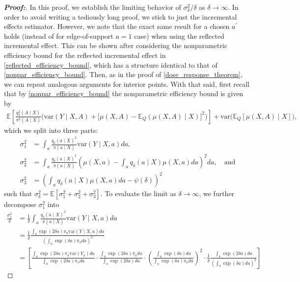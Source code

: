 \documentclass[10pt,a4paper]{amsart}
\newcommand{\var}{\text{var}}
\begin{document}
\begin{proof}[\textbf{Proof:}]
In this proof, we establish the limiting behavior of $\sigma^2_\delta / \delta$ as $\delta \to \infty$. In order to avoid writing a tediously long proof, we stick to just the incremental effects estimator. However, we note that the exact same result for a chosen $a^\prime$ holds (instead of for edge-of-support $a = 1$ case) when using the reflected incremental effect. This can be shown after considering the nonparametric efficiency bound for the reflected incremental effect in \cref{reflected_efficiency_bound}, which has a structure identical to that of \cref{nonpar_efficiency_bound}. Then, as in the proof of \cref{dose_response_theorem}, we can repeat analogous arguments for interior points. With that said, first recall that by \cref{nonpar_efficiency_bound} the nonparametric efficiency bound is given by
 \begin{align*}
     \mathbb{E}\left[\frac{q^2_\delta(A \mid X)}{\pi^2(A \mid X)} \Big( \var\left( Y \mid X, A \right) +  \big[ \mu(X, A) - \mathbb{E}_Q(\mu(X, A) \mid X) \big]^2 \Big) \right] + \var\Big( \mathbb{E}_Q\left[\mu(X, A) \mid X \right] \Big),
\end{align*}
which we split into three parts:
\begin{align*}
    \sigma_1^2 &= \int_a \frac{q_\delta(a \mid X)^2}{\pi(a \mid X)} \var\left( Y \mid X, a \right) da, \\
    \sigma_2^2 &= \int_a \frac{q_\delta(a \mid X)^2}{\pi(a \mid X)}\left( \mu(X, a) - \int_a q_\delta(a \mid X) \mu(X, a)da \right)^2 da, \quad \text{and}\\
    \sigma_3^2 &= \left(\int_a q_\delta(a \mid X) \mu(X, a)da  - \psi(\delta) \right)^2
\end{align*}
such that $\sigma^2_\delta = \mathbb{E}\left[\sigma_1^2 + \sigma_2^2 + \sigma_3^2 \right]$. To evaluate the limit as $\delta \to \infty$, we further decompose $\sigma^2_1$ into
\begin{align*}
    \frac{\sigma^2_1}{\delta} &= \frac{1}{\delta} \int_a \frac{q_\delta(a \mid X)^2}{\pi(a \mid X)} \var\left( Y \mid X, a \right) da \\
    &= \frac{1}{\delta} \frac{\int_a \exp(2 \delta a) \pi_a \var\left( Y \mid X, a \right) da}{\left(\int_a \exp(\delta a) \pi_a da \right)^2} \\
    &= \left[ \frac{\int_a \exp(2 \delta a) \pi_a\var(Y_a) da}{\int_a \exp(2 \delta a) \pi_a da }  \cdot \frac{\int_a \exp(2 \delta a) \pi_a  da}{ \int_a \exp(2 \delta a) da } \cdot \left( \frac{ \int_a \exp(\delta a) da }{\int_a  \exp(\delta a) \pi_a  da } \right)^2 \cdot \frac{1}{\delta} \frac{\int_a \exp(2 \delta a)  da}{\left( \int_a \exp(\delta a) da \right)^2} \right]

\end{align*}
\end{proof}
\end{document}
